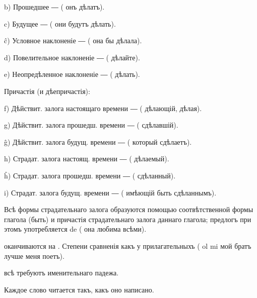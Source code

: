         b) Прошедшее ―  ( онъ дѣлатъ).
        
        c) Будущее ―  ( они будутъ дѣлать).
        
        ĉ) Условное наклоненіе ―  ( она бы дѣлала).
        
        d) Повелительное наклоненіе ―  ( дѣлайте).
        
        e) Неопредѣленное наклоненіе ―  ( дѣлать).
        
\begin{center}
Причастія (и дѣепричастія):
\end{center}
    
        f) Дѣйствит. залога настоящаго времени ―  ( дѣлающій,  дѣлая).
        
        g) Дѣйствит. залога прошедш. времени ―  ( сдѣлавшій).
        
        ĝ) Дѣйствит. залога будущ. времени ―  ( который сдѣлаетъ).
        
        h) Страдат. залога настоящ. времени ―  ( дѣлаемый).
        
        ĥ) Страдат. залога прошедш. времени ―  ( сдѣланный).
        
        i) Страдат. залога будущ. времени ―  ( имѣющій быть сдѣланнымъ).

    Всѣ формы страдательнаго залога образуются помощью соотвѣтственной формы глагола  (быть) и причастія страдательнаго залога даннаго глагола; предлогъ при этомъ употребляется de (  она любима всѣми).
    
     оканчиваются на . Степени сравненія какъ у прилагательныхъ (  ol mi мой братъ лучше меня поетъ).
    
     всѣ требуютъ именительнаго падежа.

\begin{samepage} 
\begin{center}
{\large{} }
\end{center}

     Каждое слово читается такъ, какъ оно написано.
\end{samepage}

